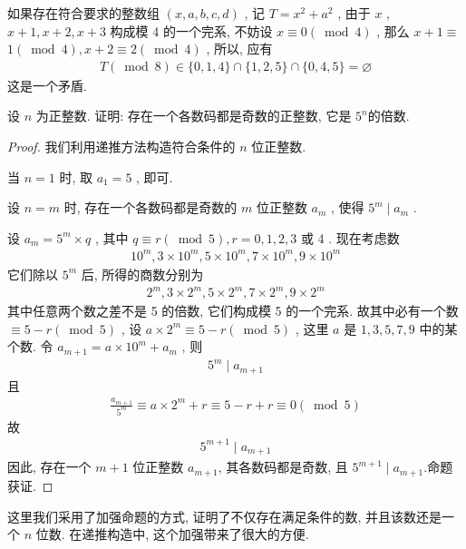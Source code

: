 \begin{solution}
	如果存在符合要求的整数组 $(x, a, b, c, d)$ , 记 $T=x^{2}+a^{2}$ , 由于 $x$ ,  $x+1, x+2, x+3$ 构成模 4 的一个完系, 不妨设 $x \equiv 0(\bmod 4)$ , 那么 $x+1 \equiv$ $1(\bmod 4), x+2 \equiv 2(\bmod 4)$ , 所以, 应有
	\begin{align*}
		T(\bmod 8) \in\{0,1,4\} \cap\{1,2,5\} \cap\{0,4,5\}=\varnothing
	\end{align*}
	这是一个矛盾.
\end{solution}

\begin{example}
	设 $n$ 为正整数. 证明: 存在一个各数码都是奇数的正整数, 它是 $5^{n}$的倍数.
\end{example}
\begin{proof}
	我们利用递推方法构造符合条件的 $n$ 位正整数.

	当 $n=1$ 时, 取 $a_{1}=5$ , 即可.

	设 $n=m$ 时, 存在一个各数码都是奇数的 $m$ 位正整数 $a_{m}$ , 使得 $5^{m} \mid a_{m}$ .

	设 $a_{m}=5^{m} \times q$ , 其中 $q \equiv r(\bmod 5), r=0,1,2,3$ 或 4 . 现在考虑数
	\begin{align*}
		10^{m}, 3 \times 10^{m}, 5 \times 10^{m}, 7 \times 10^{m}, 9 \times 10^{m}
	\end{align*}
	它们除以 $5^{m}$ 后, 所得的商数分别为
	\begin{align*}
		2^{m}, 3 \times 2^{m}, 5 \times 2^{m}, 7 \times 2^{m}, 9 \times 2^{m}
	\end{align*}
	其中任意两个数之差不是 5 的倍数, 它们构成模 5 的一个完系. 故其中必有一个数 $\equiv 5-r(\bmod 5)$ , 设 $a \times 2^{m} \equiv 5-r(\bmod 5)$ , 这里 $a$ 是 $1 ,  3 ,  5 ,  7 ,  9$ 中的某个数. 令 $a_{m+1}=a \times 10^{m}+a_{m}$ , 则
	\begin{align*}
		5^{m} \mid a_{m+1}
	\end{align*}
	且
	\begin{align*}
		\frac{a_{m+1}}{5^{m}} \equiv a \times 2^{m}+r \equiv 5-r+r \equiv 0(\bmod 5)
	\end{align*}
	故
	\begin{align*}
		5^{m+1} \mid a_{m+1}
	\end{align*}
	因此, 存在一个 $m+1$ 位正整数 $a_{m+1}$, 其各数码都是奇数, 且 $5^{m+1} \mid a_{m+1}$.命题获证.
\end{proof}
\begin{note}
	这里我们采用了加强命题的方式, 证明了不仅存在满足条件的数, 并且该数还是一个 $n$ 位数. 在递推构造中, 这个加强带来了很大的方便.
\end{note}

